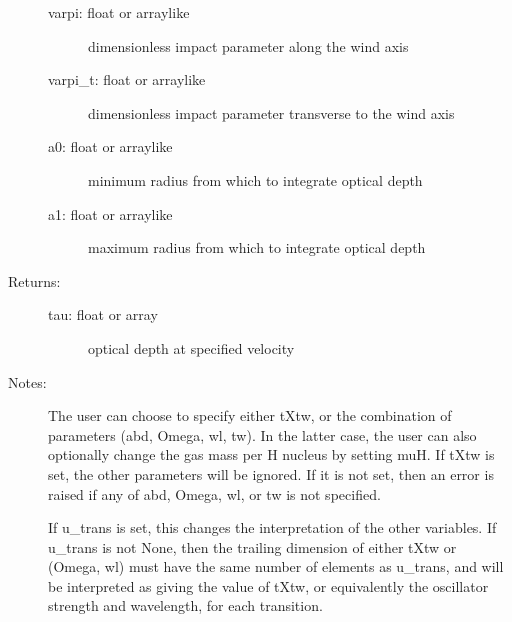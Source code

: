 \documentclass[letterpaper,10pt,english]{sphinxmanual}
\begin{document}
\begin{fulllineitems}
\begin{fulllineitems}
\begin{description}
\begin{description}
\item[{varpi: float or arraylike}] \leavevmode
dimensionless impact parameter along the wind axis

\item[{varpi\_t: float or arraylike}] \leavevmode
dimensionless impact parameter transverse to the wind axis

\item[{a0: float or arraylike}] \leavevmode
minimum radius from which to integrate optical depth

\item[{a1: float or arraylike}] \leavevmode
maximum radius from which to integrate optical depth

\end{description}

\item[{Returns:}] \leavevmode\begin{description}
\item[{tau: float or array}] \leavevmode
optical depth at specified velocity

\end{description}

\item[{Notes:}] \leavevmode
The user can choose to specify either tXtw, or the
combination of parameters (abd, Omega, wl, tw). In the
latter case, the user can also optionally change the gas
mass per H nucleus by setting muH. If tXtw is set, the
other parameters will be ignored. If it is not set, then an
error is raised if any of abd, Omega, wl, or tw is not
specified.

If u\_trans is set, this changes the interpretation of the
other variables. If u\_trans is not None, then the trailing
dimension of either tXtw or (Omega, wl) must have the same
number of elements as u\_trans, and will be interpreted as
giving the value of tXtw, or equivalently the oscillator
strength and wavelength, for each transition.

\end{description}

\end{fulllineitems}



\end{fulllineitems}
\end{document}
